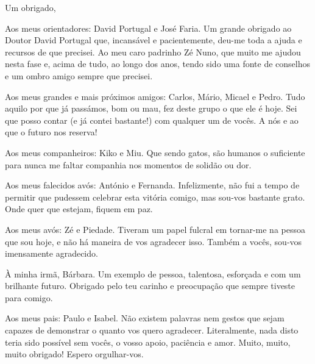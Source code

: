 \documentclass[class=report, crop=false, a4paper, 12pt]{standalone}
\begin{document}
\noindent Um obrigado,

\vspace{0.5\baselineskip}
\par Aos meus orientadores: David Portugal e José Faria. Um grande obrigado ao Doutor David Portugal que, incansável e pacientemente, deu-me toda a ajuda e recursos de que precisei. Ao meu caro padrinho Zé Nuno, que muito me ajudou nesta fase e, acima de tudo, ao longo dos anos, tendo sido uma fonte de conselhos e um ombro amigo sempre que precisei.

\vspace{0.5\baselineskip}
\par Aos meus grandes e mais próximos amigos: Carlos, Mário, Micael e Pedro. Tudo aquilo por que já passámos, bom ou mau, fez deste grupo o que ele é hoje. Sei que posso contar (e já contei bastante!) com qualquer um de vocês. A nós e ao que o futuro nos reserva!

\vspace{0.5\baselineskip}
\par Aos meus companheiros: Kiko e Miu. Que sendo gatos, são humanos o suficiente para nunca me faltar companhia nos momentos de solidão ou dor.

\vspace{0.5\baselineskip}
\par Aos meus falecidos avós: António e Fernanda. Infelizmente, não fui a tempo de permitir que pudessem celebrar esta vitória comigo, mas sou-vos bastante grato. Onde quer que estejam, fiquem em paz.

\vspace{0.5\baselineskip}
\par Aos meus avós: Zé e Piedade. Tiveram um papel fulcral em tornar-me na pessoa que sou hoje, e não há maneira de vos agradecer isso. Também a vocês, sou-vos imensamente agradecido.

\vspace{0.5\baselineskip}
\par À minha irmã, Bárbara. Um exemplo de pessoa, talentosa, esforçada e com um brilhante futuro. Obrigado pelo teu carinho e preocupação que sempre tiveste para comigo.

\vspace{0.5\baselineskip}
\par Aos meus pais: Paulo e Isabel. Não existem palavras nem gestos que sejam capazes de demonstrar o quanto vos quero agradecer. Literalmente, nada disto teria sido possível sem vocês, o vosso apoio, paciência e amor. Muito, muito, muito obrigado! Espero orgulhar-vos.
\end{document}

